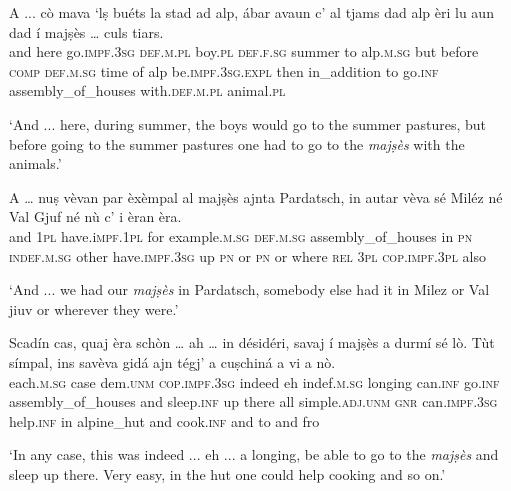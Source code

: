 \begin{linenumbers}
	\gll  A ... cò mava `lṣ buéts la stad ad alp, ábar avaun c’ al tjams dad alp èri lu aun dad í majṣès … culs tiars.  \\
and {} here go.\textsc{impf.3sg} \textsc{def.m.pl} boy.\textsc{pl} \textsc{def.f.sg} summer to alp.\textsc{m.sg} but before \textsc{comp} \textsc{def.m.sg} time of alp be.\textsc{impf.3sg.expl} then in\_addition to go.\textsc{inf} assembly\_of\_houses {} with.\textsc{def.m.pl} animal.\textsc{pl}\\
\end{linenumbers}
\medskip
\glt `And ... here, during summer, the boys would go to the summer pastures, but before going to the summer pastures one had to go to the \textit{majṣès} with the animals.'
\medskip

\begin{linenumbers}
	\gll A … nuṣ vèvan par èxèmpal al majṣès ajnta Pardatsch, in autar vèva sé Miléz né Val Gjuf né nù c’ i èran èra.\\
	and {} \textsc{1pl} have.i\textsc{mpf.1pl} for example.\textsc{m.sg} \textsc{def.m.sg}  assembly\_of\_houses in \textsc{pn}  \textsc{indef.m.sg} other have.\textsc{impf.3sg} up \textsc{pn} or \textsc{pn} {} or where \textsc{rel} \textsc{3pl} \textsc{cop.impf.3pl} also \\
\end{linenumbers}
\medskip
\glt `And ... we had our \textit{majṣès} in Pardatsch, somebody else had it in Milez or Val jiuv or wherever they were.'
\medskip

\begin{linenumbers}
	\gll Scadín cas, quaj èra schòn … ah … in désidéri, savaj í majṣès a durmí sé lò. Tùt símpal, ins savèva gidá ajn tégj’ a cuṣchiná a vi a nò.\\
	each.\textsc{m.sg} case dem.\textsc{unm} \textsc{cop.impf.3sg} indeed {} eh {} indef.\textsc{m.sg} longing can.\textsc{inf} go.\textsc{inf} assembly\_of\_houses and sleep.\textsc{inf} up there all simple.\textsc{adj.unm} \textsc{gnr} can.\textsc{impf.3sg} help.\textsc{inf} in alpine\_hut and cook.\textsc{inf} and to and fro\\
\end{linenumbers}
\medskip
\glt `In any case, this was indeed ... eh ... a longing, be able to go to the \textit{majṣès} and sleep up there. Very easy, in the hut one could help cooking and so on.'
\medskip

